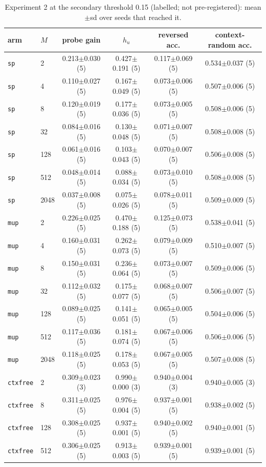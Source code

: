 \begin{table}[htbp]\centering\scriptsize
\caption{Experiment 2 at the secondary threshold 0.15 (labelled; not pre-registered): mean$\pm$sd over seeds that reached it.}\label{tab:exp2_015}
\begin{tabular}{llcccc}\toprule
arm & $M$ & probe gain & $h_u$ & reversed acc. & context-random acc. \\ \midrule
\texttt{sp} & 2 & 0.213$\pm$0.030 (5) & 0.427$\pm$0.191 (5) & 0.117$\pm$0.069 (5) & 0.534$\pm$0.037 (5) \\
\texttt{sp} & 4 & 0.110$\pm$0.027 (5) & 0.167$\pm$0.049 (5) & 0.073$\pm$0.006 (5) & 0.507$\pm$0.006 (5) \\
\texttt{sp} & 8 & 0.120$\pm$0.019 (5) & 0.177$\pm$0.036 (5) & 0.073$\pm$0.005 (5) & 0.508$\pm$0.006 (5) \\
\texttt{sp} & 32 & 0.084$\pm$0.016 (5) & 0.130$\pm$0.048 (5) & 0.071$\pm$0.007 (5) & 0.508$\pm$0.008 (5) \\
\texttt{sp} & 128 & 0.061$\pm$0.016 (5) & 0.103$\pm$0.043 (5) & 0.070$\pm$0.007 (5) & 0.506$\pm$0.008 (5) \\
\texttt{sp} & 512 & 0.048$\pm$0.014 (5) & 0.088$\pm$0.034 (5) & 0.073$\pm$0.010 (5) & 0.508$\pm$0.008 (5) \\
\texttt{sp} & 2048 & 0.037$\pm$0.008 (5) & 0.075$\pm$0.026 (5) & 0.078$\pm$0.011 (5) & 0.509$\pm$0.009 (5) \\
\midrule
\texttt{mup} & 2 & 0.226$\pm$0.025 (5) & 0.470$\pm$0.188 (5) & 0.125$\pm$0.073 (5) & 0.538$\pm$0.041 (5) \\
\texttt{mup} & 4 & 0.160$\pm$0.031 (5) & 0.262$\pm$0.073 (5) & 0.079$\pm$0.009 (5) & 0.510$\pm$0.007 (5) \\
\texttt{mup} & 8 & 0.150$\pm$0.031 (5) & 0.236$\pm$0.064 (5) & 0.073$\pm$0.007 (5) & 0.509$\pm$0.006 (5) \\
\texttt{mup} & 32 & 0.112$\pm$0.032 (5) & 0.175$\pm$0.077 (5) & 0.068$\pm$0.007 (5) & 0.506$\pm$0.007 (5) \\
\texttt{mup} & 128 & 0.089$\pm$0.025 (5) & 0.141$\pm$0.051 (5) & 0.065$\pm$0.005 (5) & 0.504$\pm$0.006 (5) \\
\texttt{mup} & 512 & 0.117$\pm$0.036 (5) & 0.181$\pm$0.074 (5) & 0.067$\pm$0.006 (5) & 0.506$\pm$0.006 (5) \\
\texttt{mup} & 2048 & 0.118$\pm$0.025 (5) & 0.178$\pm$0.053 (5) & 0.067$\pm$0.005 (5) & 0.507$\pm$0.008 (5) \\
\midrule
\texttt{ctxfree} & 2 & 0.309$\pm$0.023 (3) & 0.990$\pm$0.000 (3) & 0.940$\pm$0.004 (3) & 0.940$\pm$0.005 (3) \\
\texttt{ctxfree} & 8 & 0.311$\pm$0.025 (5) & 0.976$\pm$0.004 (5) & 0.937$\pm$0.001 (5) & 0.938$\pm$0.002 (5) \\
\texttt{ctxfree} & 128 & 0.308$\pm$0.025 (5) & 0.937$\pm$0.001 (5) & 0.940$\pm$0.002 (5) & 0.940$\pm$0.001 (5) \\
\texttt{ctxfree} & 512 & 0.306$\pm$0.025 (5) & 0.913$\pm$0.003 (5) & 0.939$\pm$0.001 (5) & 0.939$\pm$0.001 (5) \\
\bottomrule
\end{tabular}\end{table}
